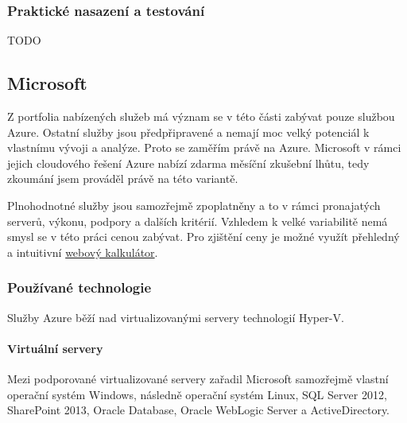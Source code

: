 \subsubsection{Praktické nasazení a testování}
TODO

\subsection{Microsoft}
Z portfolia nabízených služeb má význam se v této části zabývat pouze službou Azure. Ostatní služby jsou předpřipravené a nemají moc velký potenciál k vlastnímu vývoji a analýze. Proto se zaměřím právě na Azure. Microsoft v rámci jejich cloudového řešení Azure nabízí zdarma měsíční zkušební lhůtu, tedy zkoumání jsem prováděl právě na této variantě.

Plnohodnotné služby jsou samozřejmě zpoplatněny a to v rámci pronajatých serverů, výkonu, podpory a dalších kritérií. Vzhledem k velké variabilitě nemá smysl se v této práci cenou zabývat. Pro zjištění ceny je možné využít přehledný a intuitivní \href{http://www.windowsazure.com/en-us/pricing/calculator/?scenario=full}{webový kalkulátor}.

\subsubsection{Používané technologie}
Služby Azure běží nad virtualizovanými servery technologií Hyper-V.

\paragraph{Virtuální servery}
Mezi podporované virtualizované servery zařadil Microsoft samozřejmě vlastní operační systém Windows, následně operační systém Linux, SQL Server 2012, SharePoint 2013, Oracle Database, Oracle WebLogic Server a ActiveDirectory.

